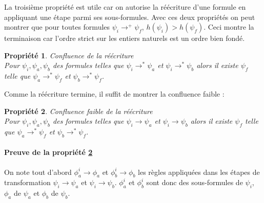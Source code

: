 \documentclass[12pt]{article}
\newcommand{\lra}{\ensuremath{\longrightarrow}}
\newtheorem{prop}{Propriété}
\begin{document}
La troisième propriété est utile car on autorise la réécriture d'une formule en appliquant une étape parmi ses sous-formules.
Avec ces deux propriétés on peut montrer que pour toutes formules \( \psi_i \longrightarrow^+ \psi_f \), \( h(\psi_i) > h(\psi_f) \).
Ceci montre la terminaison car l'ordre strict sur les entiers naturels est un ordre bien fondé.

\begin{prop} \emph{Confluence de la réécriture} \\
  Pour \( \psi_i, \psi_a, \psi_b \) des formules telles que \( \psi_i \longrightarrow^* \psi_a \) et \( \psi_i \longrightarrow^* \psi_b \) alors il existe \( \psi_f \) telle que \( \psi_a \longrightarrow^* \psi_f \) et \( \psi_b \longrightarrow^* \psi_f \).
\end{prop}

Comme la réécriture termine, il suffit de montrer la confluence faible :

\begin{prop} \emph{Confluence faible de la réécriture} \\
  \label{confl_faible}
  Pour \( \psi_i, \psi_a, \psi_b \) des formules telles que \( \psi_i \longrightarrow \psi_a \) et \( \psi_i \longrightarrow \psi_b \) alors il existe \( \psi_f \) telle que \( \psi_a \longrightarrow^* \psi_f \) et \( \psi_b \longrightarrow^* \psi_f \).
\end{prop}


\paragraph{Preuve de la propriété \ref{confl_faible}}
On note tout d'abord \(\phi_a^i \longrightarrow \phi_a\) et \(\phi_b^i \longrightarrow \phi_b\) les règles appliquées dans les étapes de transformation \(\psi_i \lra \psi_a\) et \(\psi_i \lra \psi_b\).
\(\phi_a^i\) et \(\phi_b^i\) sont donc des sous-formules de \(\psi_i\), \(\phi_a\) de \(\psi_a\) et \(\phi_b\) de \(\psi_b\).
\begin{comment}
On pose tout d'abord les notations :
\[ \psi_i = C_a[\phi_a^i] \longrightarrow C_a[\phi_a] = \psi_a \]
\[ \psi_i = C_b[\phi_b^i] \longrightarrow C_b[\phi_b] = \psi_b \]
où les règles appliquées sont \( \phi_a^i \longrightarrow \phi_a \) et \( \phi_b^i \longrightarrow \phi_b \).
\end{comment}

\end{document}
